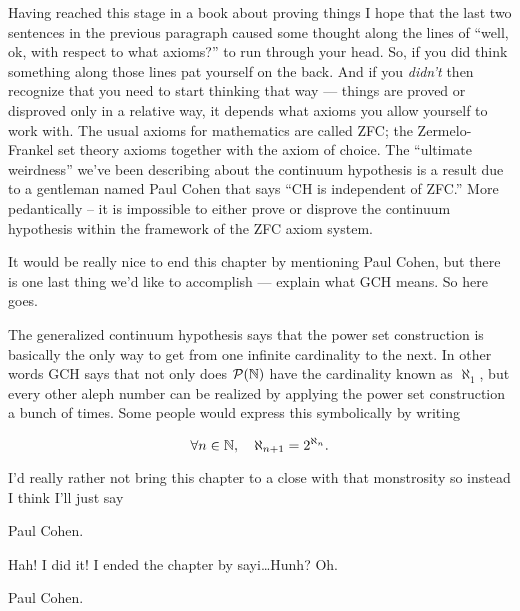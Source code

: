 Having reached this stage in a book about proving things I hope that the 
last two sentences in the previous paragraph caused some thought along the 
lines of ``well, ok, with respect to what axioms?'' to run through your
head.   So, if you did think something along those lines pat yourself on the
back.  And if you \emph{didn't} then recognize that you need to start thinking
that way --- things are proved or disproved only in a relative way, it depends
what axioms you allow yourself to work with.  The usual axioms for mathematics
are called ZFC; the Zermelo-Frankel set theory axioms together with the 
axiom of choice.  The ``ultimate weirdness'' we've been describing about
the continuum hypothesis is a result due to a gentleman named  Paul Cohen that says ``CH is independent of ZFC.''   More pedantically -- 
it is impossible to either prove or disprove the continuum hypothesis within 
the framework of the ZFC axiom system.  

It would be really nice to end this chapter by mentioning Paul Cohen, but there
is one last thing we'd like to accomplish --- explain what GCH means.  So
here goes.  

The generalized continuum hypothesis says that the power set construction
is basically the only way to get from one infinite cardinality to the next.
In other words GCH says that not only does ${\mathcal P}({\mathbb N})$ have the
cardinality known as $\aleph_1$, but every other aleph number can be realized 
by applying the power set construction a bunch of times.  Some people would 
express this symbolically by writing 

\[ \forall n \in {\mathbb N}, \quad \aleph_{n+1} = 2^{\aleph_n}. \]

I'd really rather not bring this chapter to a close with that monstrosity 
so instead I think I'll just say

\centerline{Paul Cohen.}

Hah! I did it! I ended the chapter by sayi\ldots Hunh?  Oh.

\newpage

Paul Cohen.   
 

